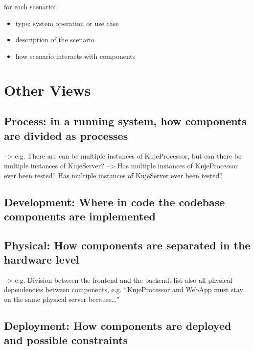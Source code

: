 \documentclass[11pt]{article}
\begin{document}
       for each scenario:
\begin{itemize}
\item type: system operation or use case
\item description of the scenario
\item how scenario interacts with components
\end{itemize} 
\section{Other Views}
\label{sec-5}

\subsection{Process: in a running system, how components are divided as processes}
\label{sec-5.1}

   --> e.g. There are can be multiple instances of KujeProcessor, but can
   there be multiple instances of KujeServer?
   --> Has multiple instances of KujeProcessor ever been tested? Has
   multiple instances of KujeServer ever been tested?

\subsection{Development: Where in code the codebase components are implemented}
\label{sec-5.2}


\subsection{Physical: How components are separated in the hardware level}
\label{sec-5.3}

   --> e.g. Division between the frontend and the backend; list also all physical
   dependencies between components, e.g. ``KujeProcessor and WebApp must stay
   on the same physical server because\ldots{}''

\subsection{Deployment: How components are deployed and possible constraints}
\label{sec-5.4}
\end{document}
